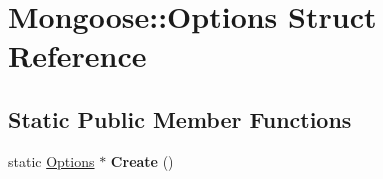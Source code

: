 \hypertarget{struct_mongoose_1_1_options}{}\section{Mongoose\+:\+:Options Struct Reference}
\label{struct_mongoose_1_1_options}
\subsection*{Static Public Member Functions}
\begin{DoxyCompactItemize}
\item 
\hypertarget{struct_mongoose_1_1_options_a08a07c33f8ecc1304ad8c93df04c09c4}{}\label{struct_mongoose_1_1_options_a08a07c33f8ecc1304ad8c93df04c09c4} 
static \hyperlink{struct_mongoose_1_1_options}{Options} $\ast$ {\bfseries Create} ()
\end{DoxyCompactItemize}
